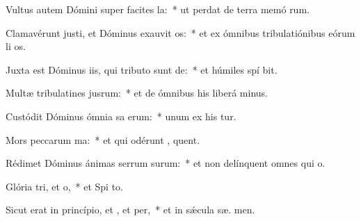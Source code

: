 \item Vultus autem Dómini super facites la:~* ut perdat de terra memó rum.
\item Clamavérunt justi, et Dóminus exauvit os:~* et ex ómnibus tribulatiónibus eórum li os.
\item Juxta est Dóminus iis, qui tributo sunt de:~* et húmiles spí bit.
\item Multæ tribulatines jusrum:~* et de ómnibus his liberá  minus.
\item Custódit Dóminus ómnia sa erum:~* unum ex his  tur.
\item Mors peccarum ma:~* et qui odérunt , quent.
\item Rédimet Dóminus ánimas serrum surum:~* et non delínquent omnes qui   o.
\item Glória tri, et o,~* et Spi to.
\item Sicut erat in princípio, et , et per,~* et in sǽcula sæ. men.

